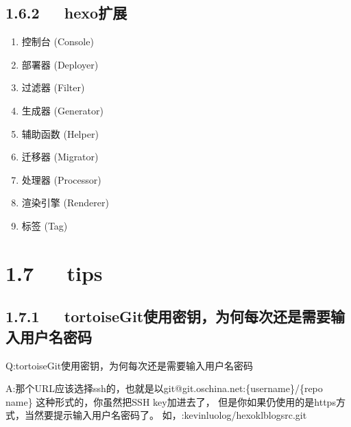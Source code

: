 \documentclass[letterpaper,12pt,english]{sphinxmanual}
\begin{document}
\subsection{1.6.2   hexo扩展}
\label{\detokenize{001software/001install/001._u7f51_u7ad9/hexo:id17}}\begin{enumerate}
%
\item {} 
控制台 (Console)

\item {} 
部署器 (Deployer)

\item {} 
过滤器 (Filter)

\item {} 
生成器 (Generator)

\item {} 
辅助函数 (Helper)

\item {} 
迁移器 (Migrator)

\item {} 
处理器 (Processor)

\item {} 
渲染引擎 (Renderer)

\item {} 
标签 (Tag)

\end{enumerate}


\section{1.7   tips}
\label{\detokenize{001software/001install/001._u7f51_u7ad9/hexo:tips}}

\subsection{1.7.1   tortoiseGit使用密钥，为何每次还是需要输入用户名密码}
\label{\detokenize{001software/001install/001._u7f51_u7ad9/hexo:tortoisegit}}

Q:tortoiseGit使用密钥，为何每次还是需要输入用户名密码

A:那个URL应该选择ssh的，也就是以git@git.oschina.net:\{username\}/\{repo name\}
这种形式的，你虽然把SSH key加进去了，
但是你如果仍使用的是https方式，当然要提示输入用户名密码了。
如，:kevinluolog/hexo\sphinxhyphen{}klblog\sphinxhyphen{}src.git
\end{document}
